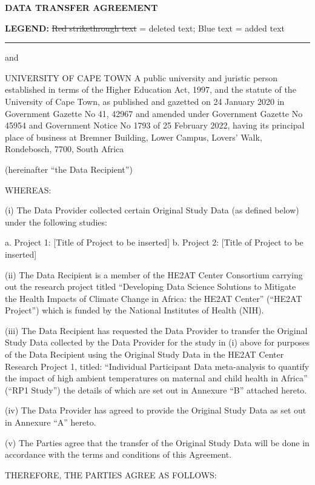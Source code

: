 \documentclass[12pt,letterpaper]{article}
\newcommand{\deleted}[1]{\textcolor{deletecolor}{\sout{#1}}}
\newcommand{\added}[1]{\textcolor{addcolor}{#1}}
\begin{document}
\onehalfspacing
\begin{center}
\textbf{\Large DATA TRANSFER AGREEMENT}
\end{center}
\textbf{LEGEND:} \deleted{Red strikethrough text} = deleted text; \added{Blue text} = added text
\vspace{0.5cm}
\hrule
\vspace{0.5cm}
and

UNIVERSITY OF CAPE TOWN A public university and juristic person established in terms of the Higher Education Act, 1997, and the statute of the University of Cape Town, as published and gazetted on 24 January 2020 in Government Gazette No 41, 42967 and amended under Government Gazette No 45954 and Government Notice No 1793 of 25 February 2022, having its principal place of business at Bremner Building, Lower Campus, Lovers’ Walk, Rondebosch, 7700, South Africa

(hereinafter “the Data Recipient”)

WHEREAS:

(i)	The Data Provider collected certain Original Study Data (as defined below) under the following studies:

a.	Project 1: [Title of Project to be inserted] b.	Project 2: [Title of Project to be inserted]

(ii)	The Data Recipient is a member of the HE2AT Center Consortium carrying out the research project titled “Developing Data Science Solutions to Mitigate the Health Impacts of Climate Change in Africa: the HE2AT Center” (“HE2AT Project”) which is funded by the National Institutes of Health (NIH).

(iii)	The Data Recipient has requested the Data Provider to transfer the Original Study Data collected by the Data Provider for the study in (i) above for purposes of the Data Recipient using the Original Study Data in the HE2AT Center Research Project 1, titled: “Individual Participant Data meta-analysis to quantify the impact of high ambient temperatures on maternal and child health in Africa” (“RP1 Study”) the details of which are set out in Annexure “B” attached hereto. 

(iv)	The Data Provider has agreed to provide the Original Study Data as set out in Annexure “A” hereto.

(v)	The Parties agree that the transfer of the Original Study Data will be done in accordance with the terms and conditions of this Agreement. 

THEREFORE, THE PARTIES AGREE AS FOLLOWS:
\end{document}
